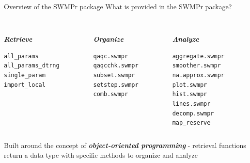 \documentclass[xcolor=svgnames]{beamer}\usepackage[]{graphicx}\usepackage[]{color}
\makeatletter
\newcommand{\hlstd}[1]{\textcolor[rgb]{0.345,0.345,0.345}{#1}}%
\newenvironment{kframe}{%
 \def\at@end@of@kframe{}%
 \ifinner\ifhmode%
  \def\at@end@of@kframe{\end{minipage}}%
  \begin{minipage}{\columnwidth}%
 \fi\fi%
 \def\FrameCommand##1{\hskip\@totalleftmargin \hskip-\fboxsep
 \colorbox{shadecolor}{##1}\hskip-\fboxsep
     \hskip-\linewidth \hskip-\@totalleftmargin \hskip\columnwidth}%
 \MakeFramed {\advance\hsize-\width
   \@totalleftmargin\z@ \linewidth\hsize
   \@setminipage}}%
 {\par\unskip\endMakeFramed%
 \at@end@of@kframe}
\newenvironment{knitrout}{}{} %
\newcommand{\Bigtxt}[1]{\textbf{\textit{#1}}}
\makeatother
\begin{document}
\begin{frame}[fragile]{Overview of the SWMPr package}
What is provided in the SWMPr package? \\~\\
\begin{columns}[t]
\begin{column}{0.3\textwidth}
\Bigtxt{Retrieve}
\begin{knitrout}\scriptsize
{}\color{fgcolor}\begin{kframe}
\begin{alltt}
\hlstd{all_params}
\hlstd{all_params_dtrng}
\hlstd{single_param}
\hlstd{import_local}
\end{alltt}
\end{kframe}
\end{knitrout}
\end{column}
\begin{column}{0.3\textwidth}
\Bigtxt{Organize}
\begin{knitrout}\scriptsize
{}\color{fgcolor}\begin{kframe}
\begin{alltt}
\hlstd{qaqc.swmpr}
\hlstd{qaqcchk.swmpr}
\hlstd{subset.swmpr}
\hlstd{setstep.swmpr}
\hlstd{comb.swmpr}
\end{alltt}
\end{kframe}
\end{knitrout}
\end{column}
\begin{column}{0.3\textwidth}
\Bigtxt{Analyze}
\begin{knitrout}\scriptsize
{}\color{fgcolor}\begin{kframe}
\begin{alltt}
\hlstd{aggregate.swmpr}
\hlstd{smoother.swmpr}
\hlstd{na.approx.swmpr}
\hlstd{plot.swmpr}
\hlstd{hist.swmpr}
\hlstd{lines.swmpr}
\hlstd{decomp.swmpr}
\hlstd{map_reserve}
\end{alltt}
\end{kframe}
\end{knitrout}
\end{column}
\end{columns}
\vspace{0.15in}
Built around the concept of \Bigtxt{object-oriented programming} - retrieval functions return a data type with specific methods to organize and analyze
\end{frame}
\end{document}
